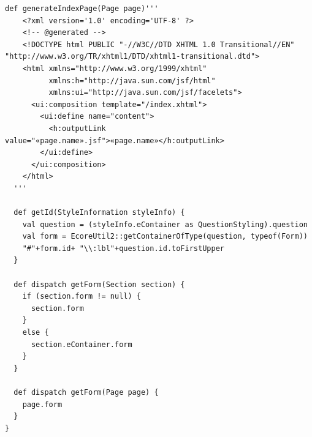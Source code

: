 \begin{lstlisting}[language=Xtend]
  def generateIndexPage(Page page)'''
	<?xml version='1.0' encoding='UTF-8' ?>
	<!-- @generated -->
	<!DOCTYPE html PUBLIC "-//W3C//DTD XHTML 1.0 Transitional//EN" "http://www.w3.org/TR/xhtml1/DTD/xhtml1-transitional.dtd">
	<html xmlns="http://www.w3.org/1999/xhtml"
	      xmlns:h="http://java.sun.com/jsf/html"
	      xmlns:ui="http://java.sun.com/jsf/facelets">
	  <ui:composition template="/index.xhtml">
	    <ui:define name="content">
	      <h:outputLink value="«page.name».jsf">«page.name»</h:outputLink>
	    </ui:define>
	  </ui:composition>
	</html>
  '''	
	
  def getId(StyleInformation styleInfo) {
	val question = (styleInfo.eContainer as QuestionStyling).question
	val form = EcoreUtil2::getContainerOfType(question, typeof(Form))
	"#"+form.id+ "\\:lbl"+question.id.toFirstUpper
  }

  def dispatch getForm(Section section) {
	if (section.form != null) {
	  section.form
	}
	else {
	  section.eContainer.form
	}
  }
	
  def dispatch getForm(Page page) {
	page.form
  }
}

\end{lstlisting}
